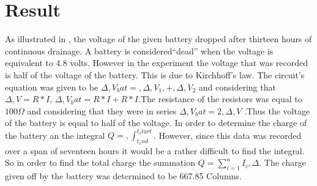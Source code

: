 \documentclass[12pt]{article}
\begin{document}
\section{Result}
As illustrated in , the voltage of the  given battery dropped after thirteen hours of continuous drainage. A battery is considered“dead” when the voltage is equivalent to 4.8 volts. However in the experiment the voltage that was recorded is half of the voltage of the battery. This is due to Kirchhoff’s law. The circuit’s equation was given to be $\Delta,V_bat=,\Delta,V_1,+,\Delta,V_2$ and considering that $\Delta,V=R*I$, $\Delta,V_bat = R*I + R*I$.The resistance of the resistors was equal to $100\Omega$ and considering that they were in series $\Delta,V_bat=2,\Delta,V$ .Thus the voltage of the battery is equal to half of the voltage. In order to determine the charge of the battery an the integral $Q=,\int_{t_end}^{t_start}$. However, since this data was recorded over a span of seventeen hours it would be a rather difficult to find the integral. So in order to find the total charge the summation $Q=\sum_{i=1}^{n}{I_i,\Delta}$. The charge given off by the battery was determined to be 667.85 Columns.
\end{document}
